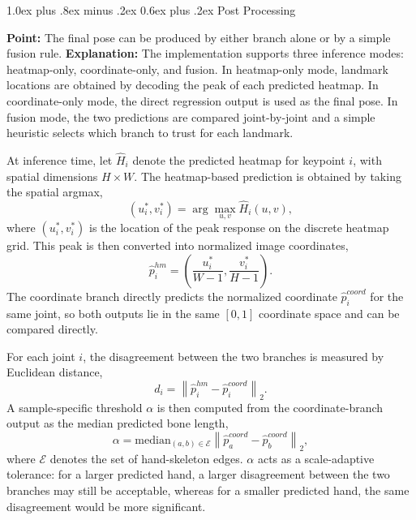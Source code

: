 \documentclass[10pt,letterpaper]{article}
\makeatletter
\renewcommand\subsection{\@startsection{subsection}{2}{\z@}%
  {1.0ex plus .8ex minus .2ex}%
  {0.6ex plus .2ex}%
  {\normalfont\itshape}}
\makeatother
\begin{document}
\subsection{Post Processing}

\noindent\textbf{Point:} The final pose can be produced by either branch alone or by a simple fusion rule.  
\textbf{Explanation:} The implementation supports three inference modes: heatmap-only, coordinate-only, and fusion. In heatmap-only mode, landmark locations are obtained by decoding the peak of each predicted heatmap. In coordinate-only mode, the direct regression output is used as the final pose. In fusion mode, the two predictions are compared joint-by-joint and a simple heuristic selects which branch to trust for each landmark.

At inference time, let \(\hat{H}_i\) denote the predicted heatmap for keypoint \(i\), with spatial dimensions \(H \times W\). The heatmap-based prediction is obtained by taking the spatial argmax,
\begin{equation}
(u_i^*, v_i^*) = \arg\max_{u,v} \hat{H}_i(u,v),
\label{eq:heatmap-argmax}
\end{equation}
where \((u_i^*, v_i^*)\) is the location of the peak response on the discrete heatmap grid. This peak is then converted into normalized image coordinates,
\begin{equation}
\hat{p}^{hm}_i =
\left(
\frac{u_i^*}{W-1},
\frac{v_i^*}{H-1}
\right).
\label{eq:heatmap-decode}
\end{equation}
The coordinate branch directly predicts the normalized coordinate \(\hat{p}^{coord}_i\) for the same joint, so both outputs lie in the same \([0,1]\) coordinate space and can be compared directly.

For each joint \(i\), the disagreement between the two branches is measured by Euclidean distance,
\begin{equation}
d_i = \left\| \hat{p}^{hm}_i - \hat{p}^{coord}_i \right\|_2.
\label{eq:fusion-disagreement}
\end{equation}
A sample-specific threshold \(\alpha\) is then computed from the coordinate-branch output as the median predicted bone length,
\begin{equation}
\alpha = \mathrm{median}_{(a,b)\in \mathcal{E}}
\left\| \hat{p}^{coord}_a - \hat{p}^{coord}_b \right\|_2,
\label{eq:fusion-threshold}
\end{equation}
where \(\mathcal{E}\) denotes the set of hand-skeleton edges. \(\alpha\) acts as a scale-adaptive tolerance: for a larger predicted hand, a larger disagreement between the two branches may still be acceptable, whereas for a smaller predicted hand, the same disagreement would be more significant.
\end{document}
